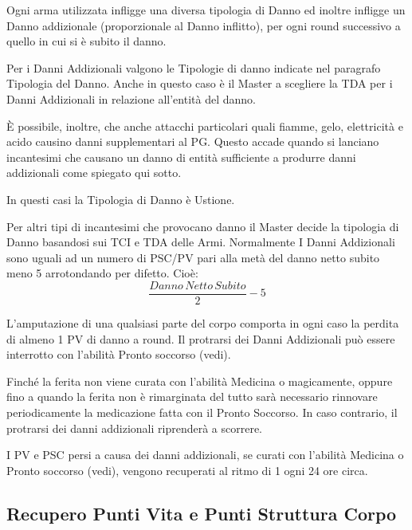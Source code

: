 Ogni arma utilizzata infligge una diversa tipologia di Danno ed
inoltre infligge un Danno addizionale (proporzionale al Danno inflitto), per
ogni round successivo a quello in cui si \`e subito il danno. 

Per i Danni Addizionali valgono le Tipologie di danno indicate nel
paragrafo Tipologia del Danno. Anche in questo caso \`e il Master a
scegliere la TDA per i Danni Addizionali in relazione all'entit\`a del
danno.

\`E possibile, inoltre, che anche attacchi particolari quali fiamme,
gelo, elettricit\`a e acido causino danni supplementari al PG. Questo
accade quando si lanciano incantesimi che causano un danno di entit\`a
sufficiente a produrre danni addizionali come spiegato qui sotto.

In questi casi la Tipologia di Danno \`e Ustione.

Per altri tipi di incantesimi che provocano danno il Master decide la
tipologia di Danno basandosi sui TCI e TDA delle Armi. Normalmente I
Danni Addizionali sono uguali ad un numero di PSC/PV pari alla met\`a
del danno netto subito meno 5 arrotondando per difetto. Cio\`e:
$$\frac{Danno\,Netto\,Subito}{2} - 5$$



L'amputazione di una qualsiasi parte del corpo comporta in ogni caso
la perdita di almeno 1 PV di danno a round. Il protrarsi dei Danni
Addizionali pu\`o essere interrotto con l'abilit\`a Pronto
soccorso (vedi).

Finch\'e la ferita non viene curata con l'abilit\`a Medicina o
magicamente, oppure fino a quando la ferita non \`e rimarginata del
tutto sar\`a necessario rinnovare periodicamente la medicazione fatta
con il Pronto Soccorso. In caso contrario, il protrarsi dei danni
addizionali riprender\`a a scorrere. 

I PV e PSC persi a causa dei danni addizionali, se curati con
l'abilit\`a Medicina o Pronto soccorso (vedi), vengono recuperati al
ritmo di 1 ogni 24 ore circa.  
\fi

\subsection{Recupero Punti Vita e Punti Struttura Corpo}

